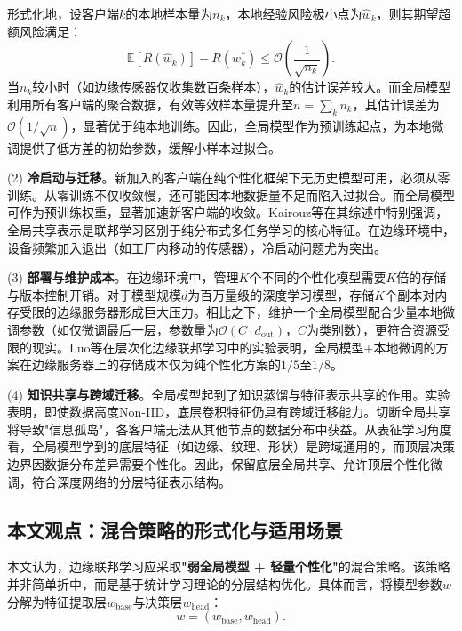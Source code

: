 \documentclass[a4paper,12pt]{article}
\begin{document}
形式化地，设客户端$k$的本地样本量为$n_k$，本地经验风险极小点为$\hat{w}_k$，则其期望超额风险满足：
\begin{equation}
\mathbb{E}[R(\hat{w}_k)] - R(w_k^*) \leq \mathcal{O}\left(\frac{1}{\sqrt{n_k}}\right).
\end{equation}
当$n_k$较小时（如边缘传感器仅收集数百条样本），$\hat{w}_k$的估计误差较大。而全局模型利用所有客户端的聚合数据，有效等效样本量提升至$n = \sum_k n_k$，其估计误差为$\mathcal{O}(1/\sqrt{n})$，显著优于纯本地训练。因此，全局模型作为预训练起点，为本地微调提供了低方差的初始参数，缓解小样本过拟合。

(2) \textbf{冷启动与迁移}。新加入的客户端在纯个性化框架下无历史模型可用，必须从零训练。从零训练不仅收敛慢，还可能因本地数据量不足而陷入过拟合。而全局模型可作为预训练权重，显著加速新客户端的收敛。Kairouz等\cite{kairouz2021advances}在其综述中特别强调，全局共享表示是联邦学习区别于纯分布式多任务学习的核心特征。在边缘环境中，设备频繁加入退出（如工厂内移动的传感器），冷启动问题尤为突出。

(3) \textbf{部署与维护成本}。在边缘环境中，管理$K$个不同的个性化模型需要$K$倍的存储与版本控制开销。对于模型规模$d$为百万量级的深度学习模型，存储$K$个副本对内存受限的边缘服务器形成巨大压力。相比之下，维护一个全局模型配合少量本地微调参数（如仅微调最后一层，参数量为$\mathcal{O}(C \cdot d_{\text{out}})$，$C$为类别数），更符合资源受限的现实。Luo等\cite{luo2022hfel}在层次化边缘联邦学习中的实验表明，全局模型+本地微调的方案在边缘服务器上的存储成本仅为纯个性化方案的$1/5$至$1/8$。

(4) \textbf{知识共享与跨域迁移}。全局模型起到了知识蒸馏与特征表示共享的作用。实验表明，即使数据高度Non-IID，底层卷积特征仍具有跨域迁移能力\cite{arivazhagan2019federated}。切断全局共享将导致"信息孤岛"，各客户端无法从其他节点的数据分布中获益。从表征学习角度看，全局模型学到的底层特征（如边缘、纹理、形状）是跨域通用的，而顶层决策边界因数据分布差异需要个性化。因此，保留底层全局共享、允许顶层个性化微调，符合深度网络的分层特征表示结构。

\subsection{本文观点：混合策略的形式化与适用场景}

本文认为，边缘联邦学习应采取\textbf{"弱全局模型 + 轻量个性化"}的混合策略。该策略并非简单折中，而是基于统计学习理论的分层结构优化。具体而言，将模型参数$w$分解为特征提取层$w_{\text{base}}$与决策层$w_{\text{head}}$：
\begin{equation}
w = (w_{\text{base}}, w_{\text{head}}).
\end{equation}
\end{document}
